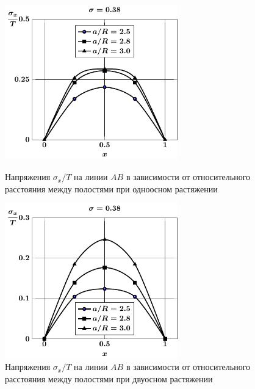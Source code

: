 \begin{figure}[th!]
\centering\footnotesize
\parbox[b]{7.5cm}{\centering\includegraphics[width=7.5cm]{spheres-cav9-a-t1-sig_x.pdf}
\caption{Напряжения $\sigma_x/T$ на линии $AB$ в зависимости от относительного расстояния между полостями при одноосном растяжении
\label{f:8:31}}}\hfil\hfil
\parbox[b]{7.5cm}{\centering\includegraphics[width=7.5cm]{spheres-cav9-a-t2-sig_x.pdf}
\caption{Напряжения $\sigma_x/T$ на линии $AB$ в зависимости от относительного расстояния между полостями при двуосном растяжении
\label{f:8:32}}}
\end{figure}

